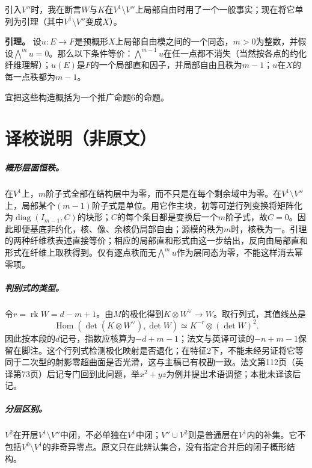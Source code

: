 \documentclass[openany,fontset=fandol]{ctexbook}
\begin{document}
引入$V''$时，我在断言$W$与$K$在$V^1\setminus V''$上局部自由时用了一个一般事实；现在将它单列为引理（其中$V^1\setminus V''$变成$X$）。

\noindent\textbf{引理。}
设$u:E\to F$是预概形$X$上局部自由模之间的一个同态，$m>0$为整数，并假设$\bigwedge^m u=0$。那么以下条件等价：$\bigwedge^{m-1}u$在任一点都不消失（当然按各点的约化纤维理解）；$u(E)$是$F$的一个局部直和因子，并局部自由且秩为$m-1$；$u$在$X$的每一点秩都为$m-1$。

宜把这些构造概括为一个推广命题6的命题。
\chapter*{译校说明（非原文）}
\paragraph{概形层面恒秩。}
在$V^1$上，$m$阶子式全部在结构层中为零，而不只是在每个剩余域中为零。在$V^1\setminus V''$上，局部某个$(m-1)$阶子式是单位。用它作主块，初等可逆行列变换将矩阵化为$\operatorname{diag}(I_{m-1},C)$的块形；$C$的每个条目都是变换后一个$m$阶子式，故$C=0$。因此即便基底非约化，核、像、余核仍局部自由；源模的秩为$m$时，核秩为一。引理的两种纤维秩表述直接等价；相应的局部直和形式由这一步给出，反向由局部直和形式在纤维上取秩得到。仅有逐点秩而无$\bigwedge^m u$作为层同态为零，不能这样消去幂零项。

\paragraph{判别式的类型。}
令$r=\operatorname{rk}W=d-m+1$。由$M$的极化得到$K\otimes W^\vee\to W$。取行列式，其值线丛是
\[
\operatorname{Hom}(\det(K\otimes W^\vee),\det W)
 \simeq K^{-r}\otimes(\det W)^2.
\]
因此按本段的$d$记号，指数应核算为$-d+m-1$；法文与英译可读的$-n+m-1$保留在脚注。这个行列式检测极化映射是否退化；在特征$2$下，不能未经另证将它等同于二次型的射影零超曲面是否光滑，这与主稿已有校勘一致。法文第112页（英译第73页）后记专门回到此问题，举$x^2+yz$为例并提出术语调整；本批未译该后记。

\paragraph{分层区别。}
$V^2$在开层$V^1\setminus V''$中闭，不必单独在$V^1$中闭；$V''\cup V^2$则是普通层在$V^1$内的补集。它不包括$V^0\setminus V^1$的非奇异零点。原文只在此辨认集合，没有指定合并后的闭子概形结构。
\end{document}
